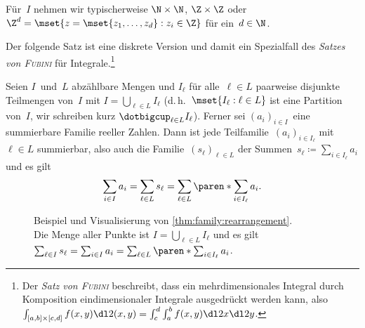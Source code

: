 \documentclass[a4paper]{article}
\begin{document}
Für~$I$ nehmen wir typischerweise $\N \times \N$, $\Z \times \Z$ oder $\Z^d = \mset{z = \mset{z_1,\dots,z_d} : z_i \in \Z}$ für ein~$d \in \N$.

Der folgende Satz ist eine diskrete Version und damit ein Spezialfall des \emph{Satzes von \textsc{Fubini}} für Integrale.\footnote{Der \emph{Satz von \textsc{Fubini}} beschreibt, dass ein mehrdimensionales Integral durch Komposition eindimensionaler Integrale ausgedrückt werden kann, also $\int_{[a,b]\times[c,d]} f(x,y) \dl2(x,y) = \int_c^d \int_a^b f(x,y) \dl2x \dl2y$.}

\begin{theorem}\label{thm:family:rearrangement}
    Seien $I$~und~$L$ abzählbare Mengen und $I_\ell$ für alle~$\ell \in L$ paarweise disjunkte Teilmengen von~$I$ mit $I = \bigcup_{\ell\in L} I_\ell$ (d.\,h.\ $\mset{I_\ell : \ell \in L}$ ist eine Partition von~$I$, wir schreiben kurz $\dotbigcup_{\ell\in L} I_\ell$). Ferner sei $(a_i)_{i\in I}$~eine summierbare Familie reeller Zahlen. Dann ist jede Teilfamilie~$(a_i)_{i\in I_\ell}$ mit~$\ell \in L$ summierbar, also auch die Familie~$(s_\ell)_{\ell\in L}$ der Summen~$s_\ell \coloneqq \sum_{i\in I_\ell} a_i$ und es gilt
    \begin{equation*}
        \sum_{i\in I} a_i = \sum_{\ell\in L} s_\ell = \sum_{\ell\in L} \paren*{\sum_{i\in I_\ell} a_i}.
    \end{equation*}
\end{theorem}

\begin{figure}
    \caption{Beispiel und Visualisierung von \cref{thm:family:rearrangement}.\\Die Menge aller Punkte ist $I = \bigcup_{\ell\in L} I_\ell$ und es gilt $\sum_{\ell\in I} s_\ell = \sum_{i \in I} a_i = \sum_{\ell\in L} \paren*{\sum_{i\in I_\ell} a_i}$.}
\end{figure}
\end{document}
